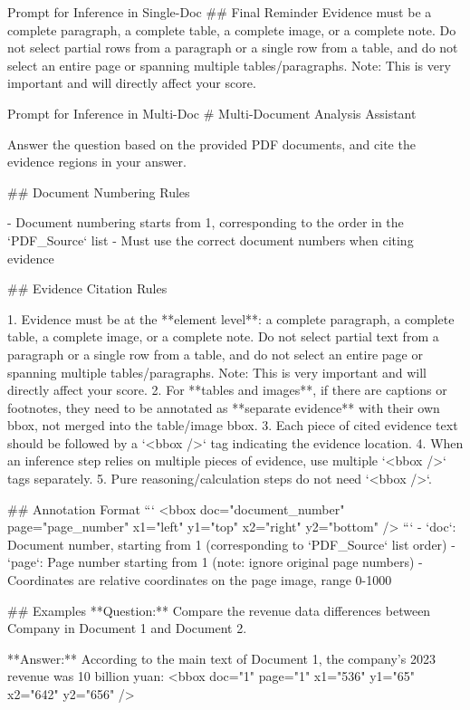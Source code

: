 \documentclass[]{opendatalab}
\begin{document}
{{{\begin{promptbox}[breakable]{Prompt for Inference in Single-Doc}
## Final Reminder
Evidence must be a complete paragraph, a complete table, a complete image, or a complete note. Do not select partial rows from a paragraph or a single row from a table, and do not select an entire page or spanning multiple tables/paragraphs. Note: This is very important and will directly affect your score.
\end{promptbox}

\begin{promptbox}[breakable]{Prompt for Inference in Multi-Doc}
# Multi-Document Analysis Assistant

Answer the question based on the provided PDF documents, and cite the evidence regions in your answer.

## Document Numbering Rules

- Document numbering starts from 1, corresponding to the order in the `PDF_Source` list
- Must use the correct document numbers when citing evidence

## Evidence Citation Rules

1. Evidence must be at the **element level**: a complete paragraph, a complete table, a complete image, or a complete note. Do not select partial text from a paragraph or a single row from a table, and do not select an entire page or spanning multiple tables/paragraphs. Note: This is very important and will directly affect your score.
2. For **tables and images**, if there are captions or footnotes, they need to be annotated as **separate evidence** with their own bbox, not merged into the table/image bbox.
3. Each piece of cited evidence text should be followed by a `<bbox />` tag indicating the evidence location.
4. When an inference step relies on multiple pieces of evidence, use multiple `<bbox />` tags separately.
5. Pure reasoning/calculation steps do not need `<bbox />`.

## Annotation Format
```
<bbox doc="document_number" page="page_number" x1="left" y1="top" x2="right" y2="bottom" />
```
- `doc`: Document number, starting from 1 (corresponding to `PDF_Source` list order)
- `page`: Page number starting from 1 (note: ignore original page numbers)
- Coordinates are relative coordinates on the page image, range 0-1000

## Examples
**Question:** Compare the revenue data differences between Company in Document 1 and Document 2.

**Answer:**
According to the main text of Document 1, the company's 2023 revenue was 10 billion yuan:
<bbox doc="1" page="1" x1="536" y1="65" x2="642" y2="656" />


\end{promptbox}}}}
\end{document}
